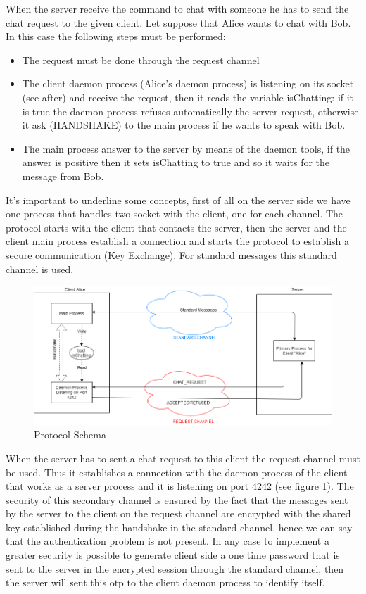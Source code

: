 \documentclass[11pt]{report}
\begin{document}
\noindent When the server receive the command to chat with someone he has to send the chat request to the given client. Let suppose that Alice wants to chat with Bob. In this case the following steps must be performed:

\begin{itemize}
	\item The request must be done through the request channel
	\item The client daemon process (Alice's daemon process) is listening on its socket (see after) and receive the request, then it reads the variable isChatting: if it is true the daemon process refuses automatically the server request, otherwise it ask (HANDSHAKE) to the main process if he wants to speak with Bob. 
	\item The main process answer to the server by means of the daemon tools, if the answer is positive then it sets isChatting to true and so it waits for the message from Bob.
\end{itemize}

\noindent It's important to underline some concepts, first of all on the server side we have one process that handles two socket with the client, one for each channel. The protocol starts with the client that contacts the server, then the server and the client main process establish a connection and starts the protocol to establish a secure communication (Key Exchange). For standard messages this standard channel is used.

\begin{figure}[H]
	\centering
	\includegraphics[scale=0.2]{img/chatRequestProtocolOneProcess.png}
	\caption{Protocol Schema}
	\label {img: chatRequestProtocolOneProcess}
\end{figure}

\noindent When the server has to sent a chat request to this client the request channel must be used. Thus it establishes a connection with the daemon process of the client that works as a server process and it is listening on port 4242 (see figure \ref{img: chatRequestProtocolOneProcess}). The security of this secondary channel is ensured by the fact that the messages sent by the server to the client on the request channel are encrypted with the shared key established during the handshake in the standard channel, hence we can say that the authentication problem is not present. In any case to implement a greater security is possible to generate client side a one time password that is sent to the server in the encrypted session through the standard channel, then the server will sent this otp to the client daemon process to identify itself.
	
\end{document}
